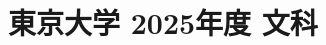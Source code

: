 ﻿\documentclass[../../uem_tok_q.tex]{subfiles}
\begin{document}
    \section{東京大学 2025年度 文科}
    \subsection{　}
    
    \vfill
    \subsection{　}
    
    \vfill
    \newpage
    \subsection{　}
    
    \vfill
    \subsection{　}
    
    \vfill
\end{document}
